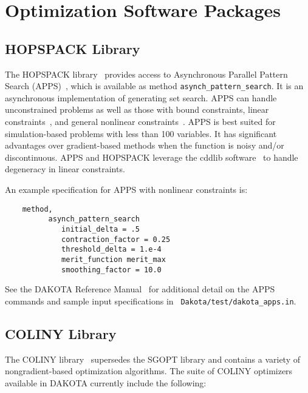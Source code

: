 \section{Optimization Software Packages}\label{opt:software}

\subsection{HOPSPACK Library}\label{opt:software:apps}

The HOPSPACK library~\cite{Plantenga2009} provides access to
Asynchronous Parallel Pattern Search (APPS)~\cite{GrKo06}, which is
available as method \texttt{asynch\_pattern\_search}.  It is an
asynchronous implementation of generating set search.  APPS can handle
unconstrained problems as well as those with bound constraints, linear
constraints~\cite{GrKoLe08}, and general nonlinear
constraints~\cite{GrKo07}.  APPS is best suited for simulation-based
problems with less than 100 variables.  It has significant advantages
over gradient-based methods when the function is noisy and/or
discontinuous.  APPS and HOPSPACK leverage the cddlib
software~\cite{Fu05} to handle degeneracy in linear constraints.

An example specification for APPS with nonlinear constraints is:
\begin{small}
\begin{verbatim}
    method,
          asynch_pattern_search
             initial_delta = .5
             contraction_factor = 0.25
             threshold_delta = 1.e-4
             merit_function merit_max
             smoothing_factor = 10.0
\end{verbatim}
\end{small} %

See the DAKOTA Reference Manual~\cite{RefMan} for additional detail on
the APPS commands and sample input specifications in {\tt
Dakota/test/dakota\_apps.in}.

\subsection{COLINY Library}\label{opt:software:coliny}

The COLINY library~\cite{Har06} supersedes the SGOPT library and contains
a variety of nongradient-based optimization algorithms. The suite of
COLINY optimizers available in DAKOTA currently include the following:


